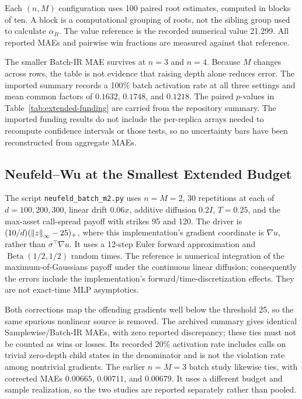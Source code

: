 Each $(n,M)$ configuration uses 100 paired root estimates, computed in blocks of ten. A block is a computational grouping of roots, not the sibling group used to calculate $\alpha_B$. The value reference is the recorded numerical value 21.299. All reported MAEs and pairwise win fractions are measured against that reference.



The smaller Batch-IR MAE survives at $n=3$ and $n=4$. Because $M$ changes across rows, the table is not evidence that raising depth alone reduces error. The imported summary records a 100\% batch activation rate at all three settings and mean common factors of $0.1632$, $0.1748$, and $0.1218$. The paired $p$-values in Table~\ref{tab:extended-funding} are carried from the repository summary. The imported funding results do not include the per-replica arrays needed to recompute confidence intervals or those tests, so no uncertainty bars have been reconstructed from aggregate MAEs.
\FloatBarrier

\subsection{Neufeld--Wu at the Smallest Extended Budget}
\label{app:extended-nw}
The script \texttt{neufeld\_batch\_m2.py} uses $n=M=2$, 30 repetitions at each of $d=100,200,300$, linear drift $0.06x$, additive diffusion $0.2I$, $T=0.25$, and the max-asset call-spread payoff with strikes 95 and 120. The driver is $(10/d)(\left\lVert z\right\rVert_\infty-25)_+$, where this implementation's gradient coordinate is $\nabla u$, rather than $\sigma^\top\nabla u$. It uses a 12-step Euler forward approximation and $\operatorname{Beta}(1/2,1/2)$ random times. The reference is numerical integration of the maximum-of-Gaussians payoff under the continuous linear diffusion; consequently the errors include the implementation's forward/time-discretization effects. They are not exact-time MLP asymptotics.



Both corrections map the offending gradients well below the threshold 25, so the same spurious nonlinear source is removed. The archived summary gives identical Samplewise/Batch-IR MAEs, with zero reported discrepancy; these ties must not be counted as wins or losses. Its recorded 20\% activation rate includes calls on trivial zero-depth child states in the denominator and is not the violation rate among nontrivial gradients. The earlier $n=M=3$ batch study likewise ties, with corrected MAEs $0.00665$, $0.00711$, and $0.00679$. It uses a different budget and sample realization, so the two studies are reported separately rather than pooled.
\FloatBarrier

